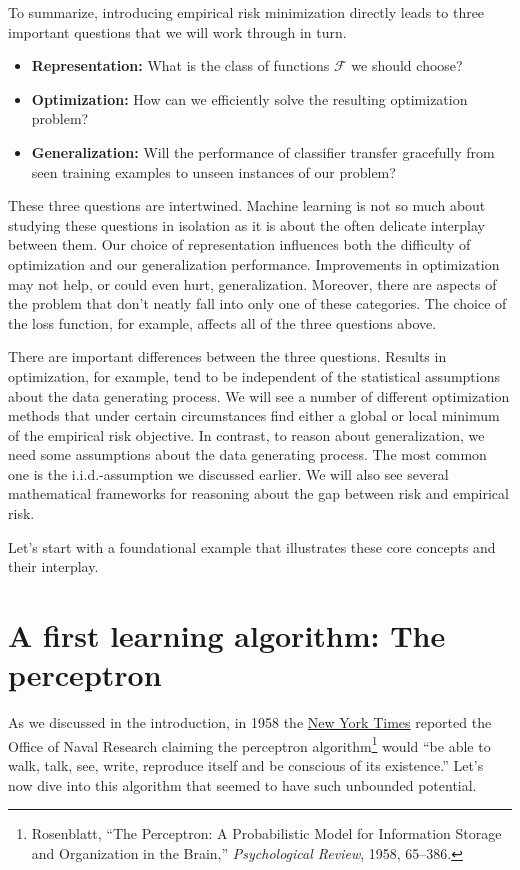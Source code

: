 \documentclass{tufte-book}
\begin{document}
To summarize, introducing empirical risk minimization directly leads to
three important questions that we will work through in turn.

\begin{itemize}
\tightlist
\item
  \textbf{Representation:} What is the class of functions
  \(\mathcal{F}\) we should choose?
\item
  \textbf{Optimization:} How can we efficiently solve the resulting
  optimization problem?
\item
  \textbf{Generalization:} Will the performance of classifier transfer
  gracefully from seen training examples to unseen instances of our
  problem?
\end{itemize}

These three questions are intertwined. Machine learning is not so much
about studying these questions in isolation as it is about the often
delicate interplay between them. Our choice of representation influences
both the difficulty of optimization and our generalization performance.
Improvements in optimization may not help, or could even hurt,
generalization. Moreover, there are aspects of the problem that don't
neatly fall into only one of these categories. The choice of the loss
function, for example, affects all of the three questions above.

There are important differences between the three questions. Results in
optimization, for example, tend to be independent of the statistical
assumptions about the data generating process. We will see a number of
different optimization methods that under certain circumstances find
either a global or local minimum of the empirical risk objective. In
contrast, to reason about generalization, we need some assumptions about
the data generating process. The most common one is the
i.i.d.-assumption we discussed earlier. We will also see several
mathematical frameworks for reasoning about the gap between risk and
empirical risk.

Let's start with a foundational example that illustrates these core
concepts and their interplay.

\hypertarget{a-first-learning-algorithm-the-perceptron}{%
\section{A first learning algorithm: The
perceptron}\label{a-first-learning-algorithm-the-perceptron}}

As we discussed in the introduction, in 1958 the
\href{https://www.nytimes.com/1958/07/08/archives/new-navy-device-learns-by-doing-psychologist-shows-embryo-of.html}{New
York Times} reported the Office of Naval Research claiming the
perceptron algorithm\footnote{Rosenblatt, {``The Perceptron: A
  Probabilistic Model for Information Storage and Organization in the
  Brain,''} \emph{Psychological Review}, 1958, 65--386.} would ``be able
to walk, talk, see, write, reproduce itself and be conscious of its
existence.'' Let's now dive into this algorithm that seemed to have such
unbounded potential.
\end{document}
